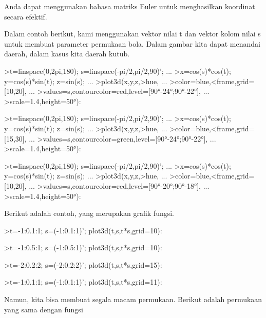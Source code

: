 \documentclass[a4paper,10pt]{article}
\begin{document}
\begin{eulernotebook}
\begin{eulercomment}
\begin{eulercomment}
\begin{eulercomment}
Anda dapat menggunakan bahasa matriks Euler untuk menghasilkan
koordinat secara efektif.

Dalam contoh berikut, kami menggunakan vektor nilai t dan vektor kolom
nilai s untuk membuat parameter permukaan bola. Dalam gambar kita
dapat menandai daerah, dalam kasus kita daerah kutub.
\end{eulercomment}
\begin{eulerprompt}
>t=linspace(0,2pi,180); s=linspace(-pi/2,pi/2,90)'; ...
>x=cos(s)*cos(t); y=cos(s)*sin(t); z=sin(s); ...
>plot3d(x,y,z,>hue, ...
>color=blue,<frame,grid=[10,20], ...
>values=s,contourcolor=red,level=[90°-24°;90°-22°], ...
>scale=1.4,height=50°):
\end{eulerprompt}
\begin{eulerprompt}
>t=linspace(0,2pi,180); s=linspace(-pi/2,pi/2,90)'; ...
>x=cos(s)*cos(t); y=cos(s)*sin(t); z=sin(s); ...
>plot3d(x,y,z,>hue, ...
>color=blue,<frame,grid=[15,30], ...
>values=s,contourcolor=green,level=[90°-24°;90°-22°], ...
>scale=1.4,height=50°):
\end{eulerprompt}
\begin{eulerprompt}
>t=linspace(0,2pi,180); s=linspace(-pi/2,pi/2,90)'; ...
>x=cos(s)*cos(t); y=cos(s)*sin(t); z=sin(s); ...
>plot3d(x,y,z,>hue, ...
>color=blue,<frame,grid=[10,20], ...
>values=s,contourcolor=red,level=[90°-20°;90°-18°], ...
>scale=1.4,height=50°):
\end{eulerprompt}
\begin{eulercomment}
Berikut adalah contoh, yang merupakan grafik fungsi.
\end{eulercomment}
\begin{eulerprompt}
>t=-1:0.1:1; s=(-1:0.1:1)'; plot3d(t,s,t*s,grid=10):
\end{eulerprompt}
\begin{eulerprompt}
>t=-1:0.5:1; s=(-1:0.5:1)'; plot3d(t,s,t*s,grid=10):
\end{eulerprompt}
\begin{eulerprompt}
>t=-2:0.2:2; s=(-2:0.2:2)'; plot3d(t,s,t*s,grid=15):
\end{eulerprompt}
\begin{eulerprompt}
>t=-1:0.1:1; s=(-1:0.1:1)'; plot3d(t,s,t*s,grid=11):
\end{eulerprompt}
\begin{eulercomment}
Namun, kita bisa membuat segala macam permukaan. Berikut adalah
permukaan yang sama dengan fungsi


\end{eulercomment}
\end{eulercomment}
\end{eulercomment}
\end{eulernotebook}
\end{document}
